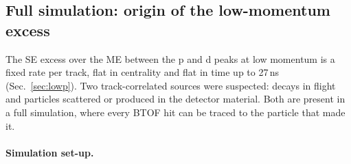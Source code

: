 \subsection{Full simulation: origin of the low-momentum excess}
\label{sec:sim}

The SE excess over the ME between the p and d peaks at low momentum is a fixed rate per track, flat in centrality and flat in time
up to 27\,ns (Sec.~\ref{sec:lowp}). Two track-correlated sources were suspected: decays in flight and particles scattered or produced
in the detector material. Both are present in a full simulation, where every BTOF hit can be traced to the particle that made it.

\paragraph{Simulation set-up.}
